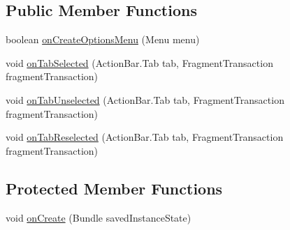 \subsection*{Public Member Functions}
\begin{DoxyCompactItemize}
\item 
boolean \hyperlink{classcom_1_1example_1_1workoutcompanion_1_1_workout_activity_ae06438356b251373878b8355e48dbeeb}{on\-Create\-Options\-Menu} (Menu menu)
\item 
void \hyperlink{classcom_1_1example_1_1workoutcompanion_1_1_workout_activity_a058429dd9b85af3a68938d753caaaed0}{on\-Tab\-Selected} (Action\-Bar.\-Tab tab, Fragment\-Transaction fragment\-Transaction)
\item 
void \hyperlink{classcom_1_1example_1_1workoutcompanion_1_1_workout_activity_a59bf7cbca8c0dc7d29df3633facce3e7}{on\-Tab\-Unselected} (Action\-Bar.\-Tab tab, Fragment\-Transaction fragment\-Transaction)
\item 
void \hyperlink{classcom_1_1example_1_1workoutcompanion_1_1_workout_activity_a030d02894f9f27ddbfc318e8ffbbedef}{on\-Tab\-Reselected} (Action\-Bar.\-Tab tab, Fragment\-Transaction fragment\-Transaction)
\end{DoxyCompactItemize}
\subsection*{Protected Member Functions}
\begin{DoxyCompactItemize}
\item 
void \hyperlink{classcom_1_1example_1_1workoutcompanion_1_1_workout_activity_ae63e0efa8659a02d91e8db8332a77c24}{on\-Create} (Bundle saved\-Instance\-State)
\end{DoxyCompactItemize}


